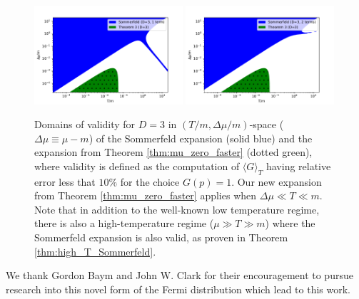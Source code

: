 \documentclass[sn-mathphys,Numbered]{sn-jnl}
\begin{document}
\begin{figure}
\centering
\includegraphics[width=0.49\textwidth]{./plot/Sommerfeld_vs_Thm3_regions_D3_1_term.pdf}
\includegraphics[width=0.49\textwidth]{./plot/Sommerfeld_vs_Thm3_regions_D3_2_terms.pdf}
\caption{Domains of validity for $D=3$ in $(T/m,\Delta\mu/m)$-space ($\Delta\mu\equiv\mu-m$) of the Sommerfeld expansion (solid blue) and the expansion from Theorem \ref{thm:mu_zero_faster} (dotted green), where validity is defined as the computation of $\langle G\rangle_T$ having relative error  less that $10\%$ for the choice  $G(p)=1$.  Our new expansion from Theorem \ref{thm:mu_zero_faster} applies when $\Delta\mu\ll T\ll m$.  Note that in addition to the well-known low temperature regime, there is also a high-temperature regime ($\mu\gg T\gg m$) where the Sommerfeld expansion is also valid, as proven in Theorem \ref{thm:high_T_Sommerfeld}. }\label{fig:Thm3_vs_Sommerfeld_regions_terms_comp}
\end{figure}


\backmatter

We thank Gordon Baym and John W. Clark for their encouragement to pursue research into this novel form of the Fermi distribution which lead to this work.


\end{document}
